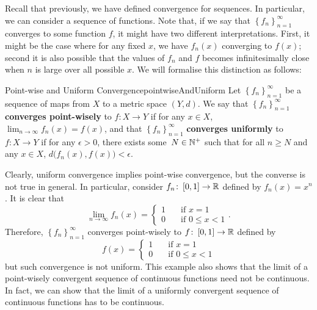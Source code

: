 \documentclass[math]{amznotes}
\theoremstyle{remark}
\begin{document}
Recall that previously, we have defined convergence for sequences. In particular, we can consider a sequence of functions. Note that, if we say that $\left\{f_n\right\}_{n = 1}^{\infty}$ converges to some function $f$, it might have two different interpretations. First, it might be the case where for any fixed $x$, we have $f_n\left(x\right)$ converging to $f\left(x\right)$; second it is also possible that the values of $f_n$ and $f$ becomes infinitesimally close when $n$ is large over all possible $x$. We will formalise this distinction as follows:
\begin{dfnbox}{Point-wise and Uniform Convergence}{pointwiseAndUniform}
    Let $\left\{f_n\right\}_{n = 1}^{\infty}$ be a sequence of maps from $X$ to a metric space $\left(Y, d\right)$. We say that $\left\{f_n\right\}_{n = 1}^{\infty}$ {\color{red} \textbf{converges point-wisely}} to $f \colon X \to Y$ if for any $x \in X$, $\lim_{n \to \infty}f_n\left(x\right) = f\left(x\right)$, and that $\left\{f_n\right\}_{n = 1}^{\infty}$ {\color{red} \textbf{converges uniformly}} to $f \colon X \to Y$ if for any $\epsilon > 0$, there exists some~$N \in \mathbb{N}^+$ such that for all $n \geq N$ and any $x \in X$, $d\bigl(f_n\left(x\right), f\left(x\right)\bigr) < \epsilon$.
\end{dfnbox}
Clearly, uniform convergence implies point-wise convergence, but the converse is not true in general. In particular, consider $f_n \colon \left[0, 1\right] \to \mathbb{R}$ defined by $f_n\left(x\right) = x^n$. It is clear that 
\begin{equation*}
    \lim_{n \to \infty}f_n\left(x\right) = \begin{cases}
        1 & \quad\textrm{if } x = 1 \\
        0 & \quad\textrm{if } 0 \leq x < 1
    \end{cases}.
\end{equation*}
Therefore, $\left\{f_n\right\}_{n = 1}^{\infty}$ converges point-wisely to $f \colon \left[0, 1\right] \to \mathbb{R}$ defined by
\begin{equation*}
    f\left(x\right) = \begin{cases}
        1 & \quad\textrm{if } x = 1 \\
        0 & \quad\textrm{if } 0 \leq x < 1
    \end{cases}
\end{equation*}
but such convergence is not uniform. This example also shows that the limit of a point-wisely convergent sequence of continuous functions need not be continuous. In fact, we can show that the limit of a uniformly convergent sequence of continuous functions has to be continuous.
\end{document}
